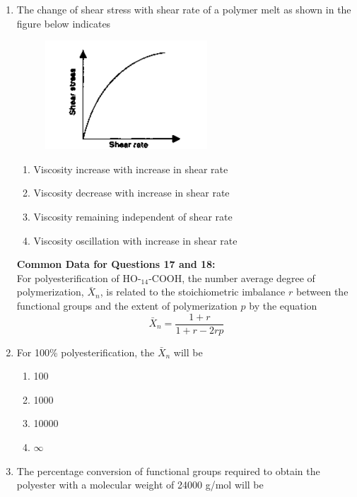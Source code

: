 \documentclass[a4paper,10pt]{article}
\begin{document}
\begin{enumerate}
\item The change of shear stress with shear rate of a polymer melt as shown in the figure below indicates
\begin{figure}[H]
    \centering
    \includegraphics[width=0.4\columnwidth]{Fq16.png}
    \caption*{}
    \label{fig:q16_poly}
\end{figure}
\hfill{}
\begin{enumerate}
\item Viscosity increase with increase in shear rate
\item Viscosity decrease with increase in shear rate
\item Viscosity remaining independent of shear rate
\item Viscosity oscillation with increase in shear rate
\end{enumerate}

\textbf{Common Data for Questions 17 and 18:} \\
For polyesterification of HO-$_{14}$-COOH, the number average degree of polymerization, $\bar{X}_n$, is related to the stoichiometric imbalance $r$ between the functional groups and the extent of polymerization $p$ by the equation
\[ \bar{X}_n = \frac{1+r}{1+r-2rp} \]

\item For 100\% polyesterification, the $\bar{X}_n$ will be
\hfill{}

\begin{multicols}{4}
\begin{enumerate}
\item 100
\item 1000
\item 10000
\item $\infty$
\end{enumerate}
\end{multicols}

\item The percentage conversion of functional groups required to obtain the polyester with a molecular weight of 24000 g/mol will be
\hfill{}


\end{enumerate}
\end{document}
